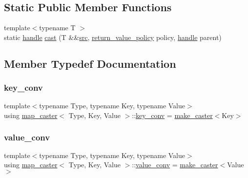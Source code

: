 \subsection*{Static Public Member Functions}
\begin{DoxyCompactItemize}
\item 
{\footnotesize template$<$typename T $>$ }\\static \mbox{\hyperlink{classhandle}{handle}} \mbox{\hyperlink{structmap__caster_a445ec6f48f16736f1076420f79f19e92}{cast}} (T \&\&\mbox{\hyperlink{_s_d_l__opengl__glext_8h_a72e0fdf0f845ded60b1fada9e9195cd7}{src}}, \mbox{\hyperlink{detail_2common_8h_adde72ab1fb0dd4b48a5232c349a53841}{return\+\_\+value\+\_\+policy}} policy, \mbox{\hyperlink{classhandle}{handle}} parent)
\end{DoxyCompactItemize}


\subsection{Member Typedef Documentation}
\mbox{\label{structmap__caster_aec5f554ce2ec2e021aa59de6dd3c6cbc}} 
\subsubsection{\texorpdfstring{key\_conv}{key\_conv}}
{\footnotesize\ttfamily template$<$typename Type, typename Key, typename Value$>$ \\
using \mbox{\hyperlink{structmap__caster}{map\+\_\+caster}}$<$ Type, Key, Value $>$\+::\mbox{\hyperlink{structmap__caster_aec5f554ce2ec2e021aa59de6dd3c6cbc}{key\+\_\+conv}} =  \mbox{\hyperlink{cast_8h_ab32b52411a6b07420516d79074815713}{make\+\_\+caster}}$<$Key$>$}

\mbox{\label{structmap__caster_a3deb01883f8f6ea4a885047f5335fa87}} 
\subsubsection{\texorpdfstring{value\_conv}{value\_conv}}
{\footnotesize\ttfamily template$<$typename Type, typename Key, typename Value$>$ \\
using \mbox{\hyperlink{structmap__caster}{map\+\_\+caster}}$<$ Type, Key, Value $>$\+::\mbox{\hyperlink{structmap__caster_a3deb01883f8f6ea4a885047f5335fa87}{value\+\_\+conv}} =  \mbox{\hyperlink{cast_8h_ab32b52411a6b07420516d79074815713}{make\+\_\+caster}}$<$Value$>$}



